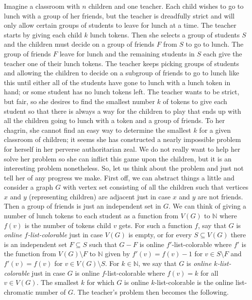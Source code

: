 \documentclass[12pt]{article}
\theoremstyle{plain}
\theoremstyle{definition}
\theoremstyle{remark}
\newcommand{\IN}{\mathbb{N}}
\begin{document}
Imagine a classroom with $n$ children and one teacher.  Each child wishes to go to lunch with a group of her friends, but the teacher is dreadfully strict
and will only allow certain groups of students to leave for lunch at a time.  The teacher starts by giving each child $k$ lunch tokens.  Then she selects
a group of students $S$ and the children must decide on a group of friends $F$ from $S$ to go to lunch.  The group of friends $F$ leave for lunch and the remaining
students in $S$ each give the teacher one of their lunch tokens.  The teacher keeps picking groups of students and allowing the children to decide on a subgroup of
friends to go to lunch like this until either all of the students have gone to lunch with a lunch token in hand; or some student has no lunch tokens left.
The teacher wants to be strict, but fair, so she desires to find the smallest number $k$ of tokens to give each student so that there is always a way for the children
to play that ends up with all the children going to lunch with a token and a group of friends.  To her chagrin, she cannot find an easy way to determine the smallest $k$
for a given classroom of children; it seems she has constructed a nearly impossible problem for herself in her perverse authoritarian zeal.  We do not really
want to help her solve her problem so she can inflict this game upon the children, but it is an interesting problem nonetheless. So, let us think about the problem and
just not tell her of any progress we make.  First off, we can abstract things a little and consider a graph $G$ with vertex set consisting of all the children 
such that vertices $x$ and $y$ (representing children) are adjacent just in case $x$ and $y$ are not friends.  Then a group of friends is just an independent set in $G$.
We can think of giving a number of lunch tokens to each student as a function from $V(G)$ to $\IN$ where $f(v)$ is the number of tokens child $v$ gets.
For such a function $f$, say that $G$ is \emph{online $f$-list-colorable} just in case $V(G)$ is empty, or for every $S \subseteq V(G)$ there is an independent set $F \subseteq S$
such that $G - F$ is online $f'$-list-colorable where $f'$ is the function from $V(G) \setminus F$ to $\IN$ given by $f'(v) = f(v) - 1$ for $v \in S \setminus F$ and $f'(v) = f(v)$
for $v \in V(G) \setminus S$.  For $k \in \IN$, we say that $G$ is \emph{online $k$-list-colorable} just in case $G$ is online $f$-list-colorable where $f(v) = k$ for all $v \in V(G)$.  
The smallest $k$ for which $G$ is online $k$-list-colorable is the online list-chromatic number of $G$.  The teacher's problem then becomes the following.  
\end{document}
